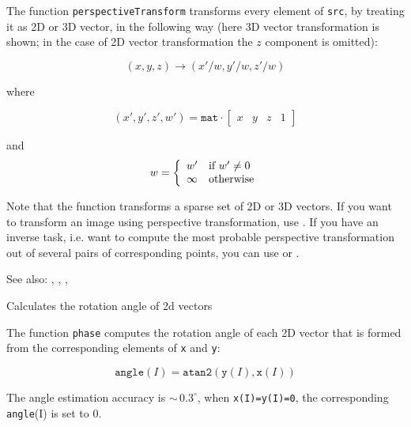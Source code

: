 The function \texttt{perspectiveTransform} transforms every element of \texttt{src},
by treating it as 2D or 3D vector, in the following way (here 3D vector transformation is shown; in the case of 2D vector transformation the $z$ component is omitted):

\[ (x, y, z) \rightarrow (x'/w, y'/w, z'/w) \]

where

\[
(x', y', z', w') = \texttt{mat} \cdot
\begin{bmatrix} x & y & z & 1 \end{bmatrix}
\]

and
\[ w = \left\{ \begin{array}{l l} w' & \mbox{if $w' \ne 0$}\\ \infty & \mbox{otherwise}\\ \end{array} \right. \]

Note that the function transforms a sparse set of 2D or 3D vectors. If you want to transform an image using perspective transformation, use . If you have an inverse task, i.e. want to compute the most probable perspective transformation out of several pairs of corresponding points, you can use  or .

See also: , , , 

Calculates the rotation angle of 2d vectors

\begin{description}
\end{description}

The function \texttt{phase} computes the rotation angle of each 2D vector that is formed from the corresponding elements of \texttt{x} and \texttt{y}:

\[\texttt{angle}(I) = \texttt{atan2}(\texttt{y}(I), \texttt{x}(I))\]

The angle estimation accuracy is $\sim\,0.3^\circ$, when \texttt{x(I)=y(I)=0}, the corresponding \texttt{angle}(I) is set to $0$.

